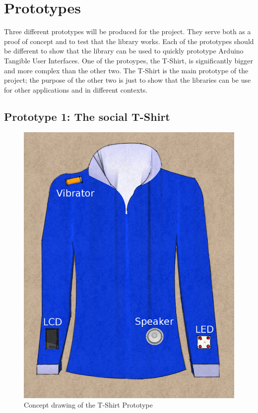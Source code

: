 \section{Prototypes}
\label{sec:prototypes}
Three different prototypes will be produced for the project. They serve both as a proof of concept and
to test that the library works. Each of the prototypes should be different to show that the library can be
used to quickly prototype Arduino Tangible User Interfaces. One of the protoypes, the T-Shirt, is significantly
bigger and more complex than the other two. The T-Shirt is the main prototype of the project; the purpose of the other two
is just to show that the libraries can be use for other applications and in different contexts.

\subsection{Prototype 1: The social T-Shirt}
	
\begin{figure}
	\begin{center}
	\includegraphics[scale=0.2]{img/design-tshirtproto}
	\end{center}
	\caption{Concept drawing of the T-Shirt Prototype}
	\label{fig:design-TShirt}
\end{figure}
	
